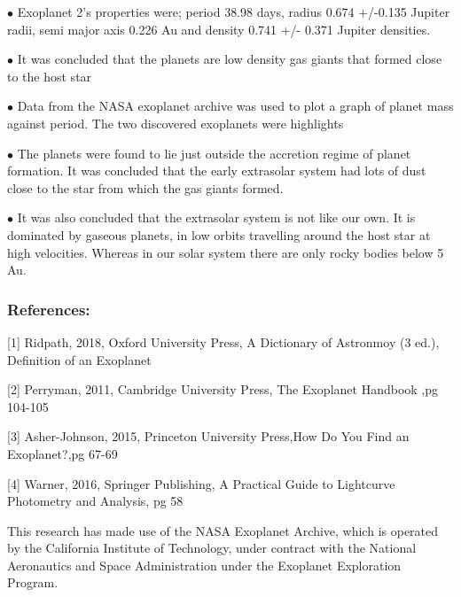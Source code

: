 \documentclass[11pt]{article}
\begin{document}
\(\bullet\) Exoplanet 2's properties were; period 38.98 days, radius
0.674 +/-0.135 Jupiter radii, semi major axis 0.226 Au and density 0.741
+/- 0.371 Jupiter densities.

\(\bullet\) It was concluded that the planets are low density gas giants
that formed close to the host star

\(\bullet\) Data from the NASA exoplanet archive was used to plot a
graph of planet mass against period. The two discovered exoplanets were
highlights

\(\bullet\) The planets were found to lie just outside the accretion
regime of planet formation. It was concluded that the early extrasolar
system had lots of dust close to the star from which the gas giants
formed.

\(\bullet\) It was also concluded that the extrasolar system is not like
our own. It is dominated by gaseous planets, in low orbits travelling
around the host star at high velocities. Whereas in our solar system
there are only rocky bodies below 5 Au.

    \subsubsection{References:}\label{references}

{[}1{]} Ridpath, 2018, Oxford University Press, A Dictionary of
Astronmoy (3 ed.), Definition of an Exoplanet

{[}2{]} Perryman, 2011, Cambridge University Press, The Exoplanet
Handbook ,pg 104-105

{[}3{]} Asher-Johnson, 2015, Princeton University Press,How Do You Find
an Exoplanet?,pg 67-69

{[}4{]} Warner, 2016, Springer Publishing, A Practical Guide to
Lightcurve Photometry and Analysis, pg 58

This research has made use of the NASA Exoplanet Archive, which is
operated by the California Institute of Technology, under contract with
the National Aeronautics and Space Administration under the Exoplanet
Exploration Program.


    
    
    
    
\end{document}
